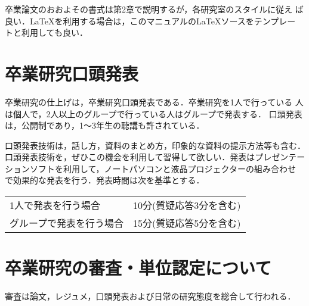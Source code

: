 卒業論文のおおよその書式は第2章で説明するが，各研究室のスタイルに従え
ば良い．\LaTeX を利用する場合は，このマニュアルの\LaTeX ソースをテンプレー
トと利用しても良い．

\section{卒業研究口頭発表}
\label{sec:presentation}

卒業研究の仕上げは，卒業研究口頭発表である．卒業研究を1人で行っている
人は個人で，2人以上のグループで行っている人はグループで発表する．
口頭発表は，公開制であり，1〜3年生の聴講も許されている．

口頭発表技術は，話し方，資料のまとめ方，印象的な資料の提示方法等も含む．
口頭発表技術を，ぜひこの機会を利用して習得して欲しい．発表はプレゼンテー
ションソフトを利用して，ノートパソコンと液晶プロジェクターの組み合わせ
で効果的な発表を行う．発表時間は次を基準とする．\\

\begin{tabular}[h]{ll}
  1人で発表を行う場合      & 10分(質疑応答3分を含む) \\
  グループで発表を行う場合 & 15分(質疑応答5分を含む) \\
\end{tabular}

\section{卒業研究の審査・単位認定について}
\label{sec:referee}
審査は論文，レジュメ，口頭発表および日常の研究態度を総合して行われる．

